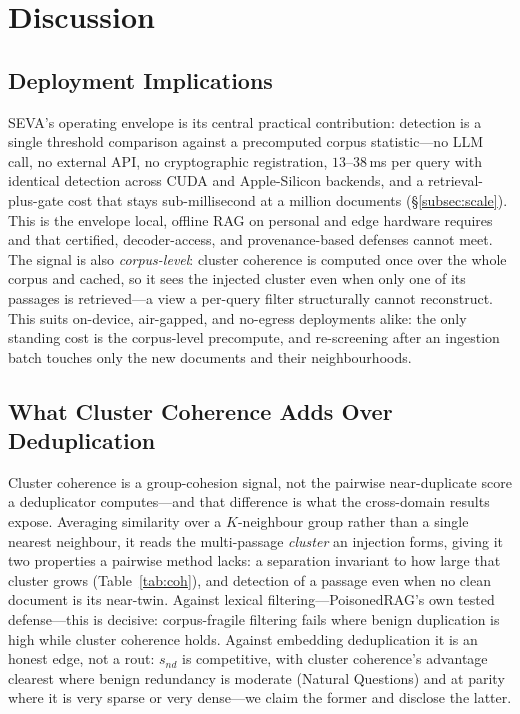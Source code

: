 \documentclass[10pt,journal,compsoc]{IEEEtran}
\begin{document}
\section{Discussion}

\subsection{Deployment Implications}
SEVA's operating envelope is its central practical contribution: detection is a single
threshold comparison against a precomputed corpus statistic---no LLM call, no external API, no
cryptographic registration, $13$--$38$\,ms per query with identical detection across CUDA and
Apple-Silicon backends, and a retrieval-plus-gate cost that stays sub-millisecond at a million
documents (\S\ref{subsec:scale}). This is the envelope local, offline RAG on personal and edge
hardware requires and that certified, decoder-access, and provenance-based defenses cannot
meet. The signal is also \emph{corpus-level}: cluster coherence is computed once over the whole
corpus and cached, so it sees the injected cluster even when only one of its passages is
retrieved---a view a per-query filter structurally cannot reconstruct. This suits on-device,
air-gapped, and no-egress deployments alike: the only standing cost is the corpus-level
precompute, and re-screening after an ingestion batch touches only the new documents and their
neighbourhoods.

\subsection{What Cluster Coherence Adds Over Deduplication}
Cluster coherence is a group-cohesion signal, not the pairwise near-duplicate score a
deduplicator computes---and that difference is what the cross-domain results expose. Averaging
similarity over a $K$-neighbour group rather than a single nearest neighbour, it reads the
multi-passage \emph{cluster} an injection forms, giving it two properties a pairwise method
lacks: a separation invariant to how large that cluster grows (Table~\ref{tab:coh}), and
detection of a passage even when no clean document is its near-twin. Against lexical
filtering---PoisonedRAG's own tested defense---this is decisive: corpus-fragile filtering fails
where benign duplication is high while cluster coherence holds. Against embedding deduplication
it is an honest edge, not a rout: $s_{nd}$ is competitive, with cluster coherence's advantage
clearest where benign redundancy is moderate (Natural Questions) and at parity where it is very
sparse or very dense---we claim the former and disclose the latter.
\end{document}
